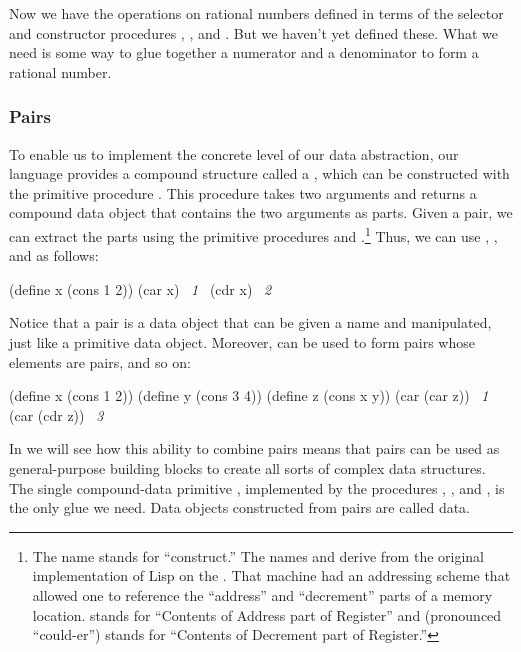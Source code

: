 Now we have the operations on rational numbers defined in terms of the selector
and constructor procedures , , and .
But we haven't yet defined these.  What we need is some way to glue together a
numerator and a denominator to form a rational number.

\subsubsection*{Pairs}

To enable us to implement the concrete level of our data abstraction, our
language provides a compound structure called a , which can be
constructed with the primitive procedure .  This procedure takes two
arguments and returns a compound data object that contains the two arguments as
parts.  Given a pair, we can extract the parts using the primitive procedures
 and .\footnote{The name  stands for
``construct.''  The names  and  derive from the original
implementation of Lisp on the .  That machine had an addressing scheme
that allowed one to reference the ``address'' and ``decrement'' parts of a
memory location.   stands for ``Contents of Address part of
Register'' and  (pronounced ``could-er'') stands for ``Contents of
Decrement part of Register.''} Thus, we can use , , and
 as follows:

\begin{codeBlock}
(define x (cons 1 2))
(car x)
~\textit{1}~
(cdr x)
~\textit{2}~
\end{codeBlock}

\noindent
Notice that a pair is a data object that can be given a name and manipulated,
just like a primitive data object.  Moreover,  can be used to form
pairs whose elements are pairs, and so on:

\begin{codeBlock}
(define x (cons 1 2))
(define y (cons 3 4))
(define z (cons x y))
(car (car z))
~\textit{1}~
(car (cdr z))
~\textit{3}~
\end{codeBlock}

\noindent
In  we will see how this ability to combine pairs means that
pairs can be used as general-purpose building blocks to create all sorts of
complex data structures. The single compound-data primitive ,
implemented by the procedures , , and , is the
only glue we need.  Data objects constructed from pairs are called
 data.


